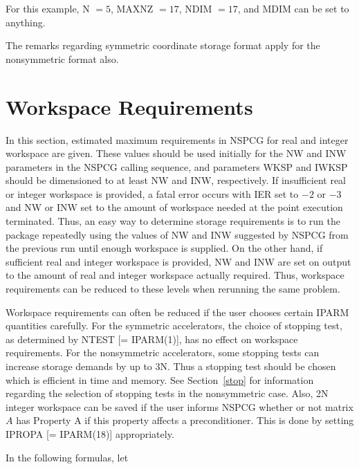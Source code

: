\begin{description}
  For this example, N $=5$, MAXNZ $=17$, NDIM $=17$, and MDIM can
  be set to anything.
 
  The remarks regarding symmetric coordinate storage format apply
  for the nonsymmetric format also.
 
\end{description}
 
\newpage
\section{Workspace Requirements}
\label{nw}
\indent

  In this section, estimated maximum requirements in NSPCG for real 
and integer workspace are given.  These values should be used initially
for the NW and INW parameters in the NSPCG calling sequence, and 
parameters WKSP and IWKSP should be dimensioned to at least NW and
INW, respectively.  If insufficient real or integer workspace is
provided, a fatal error occurs with IER set to $-2$ or $-3$ and NW or
INW set to the amount of workspace needed at the point execution
terminated.  Thus, an easy way to determine storage requirements is
to run the package repeatedly using the values of NW and INW suggested
by NSPCG from the previous run until enough workspace is supplied.  
On the other hand, if sufficient real and integer workspace
is provided, NW and INW are set on output to the amount of real and
integer workspace actually required.  Thus, workspace requirements can
be reduced to these levels when rerunning the same problem.

  Workspace requirements can often be reduced if the user chooses
certain IPARM quantities carefully.  For the symmetric accelerators,
the choice of stopping test, as determined by NTEST [= IPARM(1)],
has no effect on workspace requirements.  For the nonsymmetric 
accelerators, some stopping tests can increase storage demands by
up to 3N.  Thus a stopping test should be chosen which is efficient 
in time and memory.  See Section~\ref{stop} for information regarding 
the selection of stopping tests in the nonsymmetric case.   
Also,
2N integer workspace can be saved if the user informs NSPCG whether
or not matrix $A$ has Property A if this property affects a
preconditioner.  This is done by setting IPROPA [= IPARM(18)]
appropriately.

   In the following formulas, let

